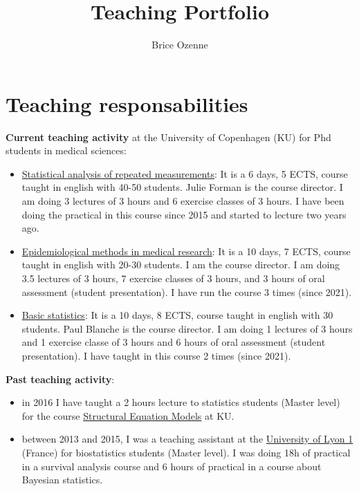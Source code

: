 \documentclass[12pt]{article}
\author{Brice Ozenne}
\date{}
\title{Teaching Portfolio}
\begin{document}
\maketitle

\section{Teaching responsabilities}
\label{sec:org3a5fd07}

\textbf{Current teaching activity} at the University of Copenhagen (KU) for
Phd students in medical sciences:
\begin{itemize}
\item \href{https://absalon.ku.dk/courses/47665}{Statistical analysis of repeated measurements}: \newline It is a 6
days, 5 ECTS, course taught in english with 40-50 students. Julie
Forman is the course director. \newline I am doing 3 lectures of 3
hours and 6 exercise classes of 3 hours. I have been doing the
practical in this course since 2015 and started to lecture two years
ago.
\item \href{https://absalon.ku.dk/courses/58764}{Epidemiological methods in medical research}: \newline It is a 10
days, 7 ECTS, course taught in english with 20-30 students. I am the
course director. \newline I am doing 3.5 lectures of 3 hours, 7
exercise classes of 3 hours, and 3 hours of oral assessment (student
presentation). I have run the course 3 times (since 2021).
\item \href{http://paulblanche.com/files/BasicStat2023.html}{Basic statistics}: \newline It is a 10 days, 8 ECTS, course taught in
english with 30 students. Paul Blanche is the course
director. \newline I am doing 1 lectures of 3 hours and 1 exercise
classe of 3 hours and 6 hours of oral assessment (student
presentation). I have taught in this course 2 times (since 2021).
\end{itemize}

\textbf{Past teaching activity}:
\begin{itemize}
\item in 2016 I have taught a 2 hours lecture to statistics students
(Master level) for the course \href{https://absalon.instructure.com/courses/2385}{Structural Equation Models} at KU.
\item between 2013 and 2015, I was a teaching assistant at the \href{https://mastersantepublique.univ-lyon1.fr/icap\_website/299/5382}{University
of Lyon 1} (France) for biostatistics students (Master level). I was
doing 18h of practical in a survival analysis course and 6 hours of
practical in a course about Bayesian statistics.
\end{itemize}
\end{document}
